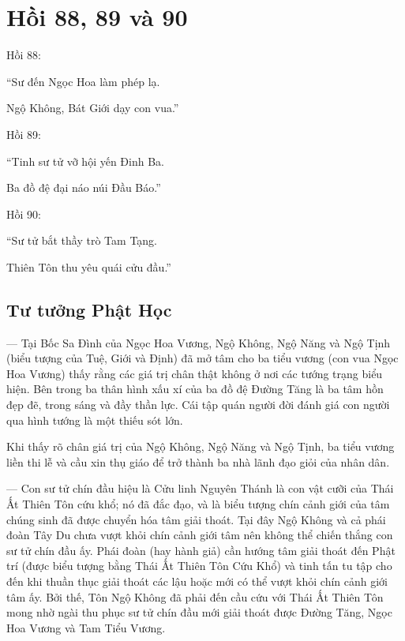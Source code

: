 \chapter{Hồi 88, 89 và 90} %
\label{cha:hoi_88_89_90}

Hồi 88:

\begin{itshape}
``Sư đến Ngọc Hoa làm phép lạ.

Ngộ Không, Bát Giới dạy con vua.''
\end{itshape}

Hồi 89:

\begin{itshape}
``Tinh sư tử vỡ hội yến Đinh Ba.

Ba đồ đệ đại náo núi Đầu Báo.''
\end{itshape}

Hồi 90:

\begin{itshape}
``Sư tử bắt thầy trò Tam Tạng.

Thiên Tôn thu yêu quái cửu đầu.''
\end{itshape}

\section{Tư tưởng Phật Học} %
\label{sec:88_89_90_phat_hoc}

--- Tại Bốc Sa Đình của Ngọc Hoa Vương, Ngộ Không, Ngộ Năng và Ngộ Tịnh (biểu tượng của Tuệ, Giới và Định) đã mở tâm cho ba tiểu vương (con vua Ngọc Hoa Vương) thấy rằng các giá trị chân thật không ở nơi các tướng trạng biểu hiện. Bên trong ba thân hình xấu xí của ba đồ đệ Đường Tăng là ba tâm hồn đẹp đẽ, trong sáng và đầy thần lực. Cái tập quán người đời đánh giá con người qua hình tướng là một thiếu sót lớn.

Khi thấy rõ chân giá trị của Ngộ Không, Ngộ Năng và Ngộ Tịnh, ba tiểu vương liền thi lễ và cầu xin thụ giáo để trở thành ba nhà lãnh đạo giỏi của nhân dân.

--- Con sư tử chín đầu hiệu là Cửu linh Nguyên Thánh là con vật cưỡi của Thái Ất Thiên Tôn cứu khổ; nó đã đắc đạo, và là biểu tượng chín cảnh giới của tâm chúng sinh đã được chuyển hóa tâm giải thoát. Tại đây Ngộ Không và cả phái đoàn Tây Du chưa vượt khỏi chín cảnh giới tâm nên không thể chiến thắng con sư tử chín đầu ấy. Phái đoàn (hay hành giả) cần hướng tâm giải thoát đến Phật trí (được biểu tượng bằng Thái Ất Thiên Tôn Cứu Khổ) và tinh tấn tu tập cho đến khi thuần thục giải thoát các lậu hoặc mới có thể vượt khỏi chín cảnh giới tâm ấy. Bởi thế, Tôn Ngộ Không đã phải đến cầu cứu với Thái Ất Thiên Tôn mong nhờ ngài thu phục sư tử chín đầu mới giải thoát được Đường Tăng, Ngọc Hoa Vương và Tam Tiểu Vương.

